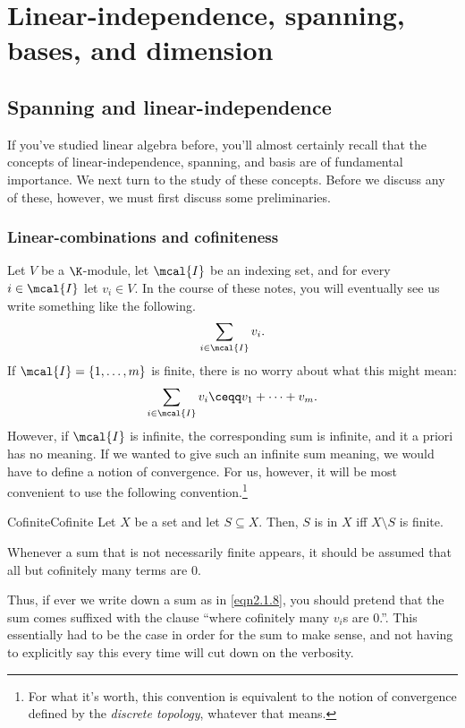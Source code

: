 \chapter{Linear-independence, spanning, bases, and dimension}

\section{Spanning and linear-independence}

If you've studied linear algebra before, you'll almost certainly recall that the concepts of linear-independence, spanning, and basis are of fundamental importance.  We next turn to the study of these concepts.  Before we discuss any of these, however, we must first discuss some preliminaries.

\subsection{Linear-combinations and cofiniteness}

Let $V$ be a $\K$-module, let $\mcal{I}$ be an indexing set, and for every $i\in \mcal{I}$ let $v_i\in V$.  In the course of these notes, you will eventually see us write something like the following.
\begin{equation}\label{eqn2.1.8}
\sum _{i\in \mcal{I}}v_i.
\end{equation}
If $\mcal{I}=\{ 1,\ldots ,m\}$ is finite, there is no worry about what this might mean:
\begin{equation}
\sum _{i\in \mcal{I}}v_i\ceqq v_1+\cdots +v_m.
\end{equation}
However, if $\mcal{I}$ is infinite, the corresponding sum is infinite, and it a priori has no meaning.  If we wanted to give such an infinite sum meaning, we would have to define a notion of convergence.  For us, however, it will be most convenient to use the following convention.\footnote{For what it's worth, this convention is equivalent to the notion of convergence defined by the \emph{discrete topology}, whatever that means.}
\begin{dfn}{Cofinite}{Cofinite}
	Let $X$ be a set and let $S\subseteq X$.  Then, $S$ is  in $X$ iff $X\setminus S$ is finite.
\end{dfn}
\begin{displayquote}
	Whenever a sum that is not necessarily finite appears, it should be assumed that all but cofinitely many terms are $0$.
\end{displayquote}
Thus, if ever we write down a sum as in \eqref{eqn2.1.8}, you should pretend that the sum comes suffixed with the clause ``\textellipsis where cofinitely many $v_i$s are $0$.''.  This essentially had to be the case in order for the sum to make sense, and not having to explicitly say this every time will cut down on the verbosity.


